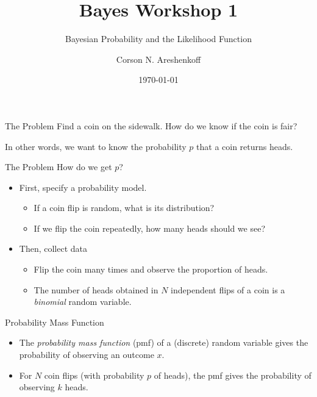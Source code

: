 \documentclass{beamer}
\title{Bayes Workshop 1}
\subtitle{Bayesian Probability and the Likelihood Function}
\date{\today}
\author{Corson N. Areshenkoff}
\institute{University of Victoria}
\begin{document}
\maketitle

\begin{frame}{The Problem}
Find a coin on the sidewalk. How do we know if the coin is fair? \par
In other words, we want to know the probability $p$ that a coin returns heads.
\end{frame}

\begin{frame}{The Problem}
How do we get $p$?
        \begin{itemize}
                \item First, specify a probability model. 
                \begin{itemize}
                        \item If a coin flip is random, what is its distribution?
                        \item If we flip the coin repeatedly, how many heads should we see?
                \end{itemize}     
                \item Then, collect data
                \begin{itemize}
                        \item Flip the coin many times and observe the proportion of heads.
                        \item The number of heads obtained in $N$ independent flips of a coin is a \emph{binomial} random variable.
                \end{itemize}                                           
        \end{itemize}
\end{frame}

\begin{frame}{Probability Mass Function}
\begin{itemize}
        \item The \emph{probability mass function} (pmf) of a (discrete) random variable gives the probability of observing an outcome $x$.
        \item For $N$ coin flips (with probability $p$ of heads), the pmf gives the probability of observing $k$ heads.
\end{itemize}        
\end{frame}
\end{document}
